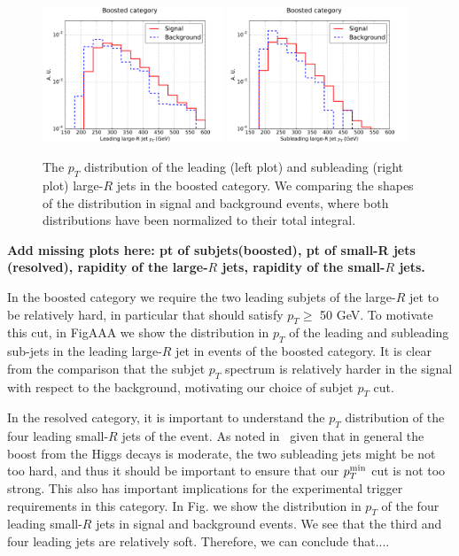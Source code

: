 \begin{figure}[t]
\begin{center}
 \includegraphics[width=0.48\textwidth]{plots/pt_H0_boost_C1.pdf}
 \includegraphics[width=0.48\textwidth]{plots/pt_H1_boost_C1.pdf}
\caption{\small  The $p_T$ distribution of the
  leading (left plot) and
  subleading (right plot) large-$R$ jets in the boosted category.
  We comparing
  the shapes of the distribution in signal and background events,
  where both
  distributions have been normalized to their total integral.
}
\label{fig:cutplots1}
\end{center}
\end{figure}

{\bf Add missing plots here: pt of subjets(boosted), pt of
  small-R jets (resolved), rapidity of the large-$R$ jets,
rapidity of the small-$R$ jets.}


In the boosted category we require the two
leading subjets of the large-$R$ jet to be relatively
hard, in particular that should satisfy $p_T \ge $ 50 GeV.
%
To motivate this cut, in FigAAA
we show the distribution in $p_T$ of the leading
and subleading sub-jets in the leading large-$R$ jet in events
of the boosted category.
%
It is clear from the comparison that the subjet $p_T$ spectrum is
relatively harder in the signal with respect to the background,
motivating our choice of subjet $p_T$ cut.

In the resolved category,
it is important to understand the $p_T$ distribution
of the four leading small-$R$ jets of the event.
%
As noted in~\cite{deLima:2014dta}
given that in general the boost from the Higgs decays is moderate,
the two subleading jets might be not too hard, and thus it
should be important to ensure that our $p_T^{\rm min}$ cut
is not too strong.
%
This also has important implications for the experimental
trigger requirements in this category.
%
In Fig. we show the distribution in $p_T$ of the four leading
small-$R$ jets in signal and background events.
%
We see that the third and four leading jets are relatively soft.
%
Therefore, we can conclude that....


